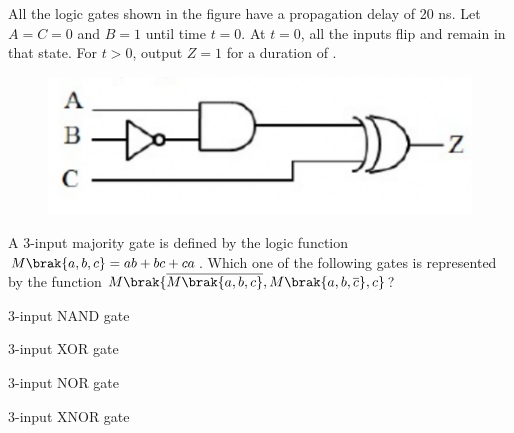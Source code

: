     \hfill{}

    \item All the logic gates shown in the figure have a propagation delay of 20 ns. Let $A=C=0$ and $B=1$ until time $t=0$. At $t=0$, all the inputs flip  and remain in that state. For $t>0$, output $Z=1$ for a duration  of \underline{\hspace{2cm}}.
    \begin{figure}[H]
        \centering
        \includegraphics[width=0.4\columnwidth]{figs/q47.png}
        \caption*{}
        \label{fig:q47}
    \end{figure}
    
    \hfill{}

    \item A 3-input majority gate is defined by the logic function $M\brak{a,b,c}=ab+bc+ca$. Which one of the following gates is represented by the function $M\brak{\overline{M\brak{a,b,c}}, M\brak{a,b,\overline{c}},c}$?
    \begin{enumerate}
    \begin{multicols}{2}
        \item 3-input NAND gate
        \item 3-input XOR gate
        \item 3-input NOR gate
        \item 3-input XNOR gate
    \end{multicols}
    \end{enumerate}
    
    \hfill{}

